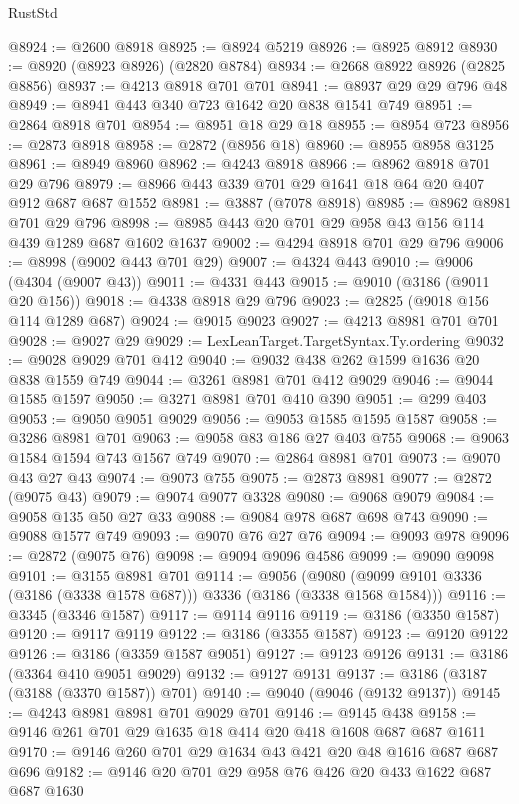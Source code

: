 \begin{lexlean}{RustStd}
\begin{coremodule}
{\begin{coremodule}
{{{{{{{{{{{{{{{{{{{{@8924 := @2600 @8918
@8925 := @8924 @5219
@8926 := @8925 @8912
@8930 := @8920 (@8923 @8926) (@2820 @8784)
@8934 := @2668 @8922 @8926 (@2825 @8856)
@8937 := @4213 @8918 @701 @701
@8941 := @8937 @29 @29 @796 @48
@8949 := @8941 @443 @340 @723 @1642 @20 @838 @1541 @749
@8951 := @2864 @8918 @701
@8954 := @8951 @18 @29 @18
@8955 := @8954 @723
@8956 := @2873 @8918
@8958 := @2872 (@8956 @18)
@8960 := @8955 @8958 @3125
@8961 := @8949 @8960
@8962 := @4243 @8918
@8966 := @8962 @8918 @701 @29 @796
@8979 := @8966 @443 @339 @701 @29 @1641 @18 @64 @20 @407 @912 @687 @687 @1552
@8981 := @3887 (@7078 @8918)
@8985 := @8962 @8981 @701 @29 @796
@8998 := @8985 @443 @20 @701 @29 @958 @43 @156 @114 @439 @1289 @687 @1602 @1637
@9002 := @4294 @8918 @701 @29 @796
@9006 := @8998 (@9002 @443 @701 @29)
@9007 := @4324 @443
@9010 := @9006 (@4304 (@9007 @43))
@9011 := @4331 @443
@9015 := @9010 (@3186 (@9011 @20 @156))
@9018 := @4338 @8918 @29 @796
@9023 := @2825 (@9018 @156 @114 @1289 @687)
@9024 := @9015 @9023
@9027 := @4213 @8981 @701 @701
@9028 := @9027 @29
@9029 := LexLeanTarget.TargetSyntax.Ty.ordering
@9032 := @9028 @9029 @701 @412
@9040 := @9032 @438 @262 @1599 @1636 @20 @838 @1559 @749
@9044 := @3261 @8981 @701 @412 @9029
@9046 := @9044 @1585 @1597
@9050 := @3271 @8981 @701 @410 @390
@9051 := @299 @403
@9053 := @9050 @9051 @9029
@9056 := @9053 @1585 @1595 @1587
@9058 := @3286 @8981 @701
@9063 := @9058 @83 @186 @27 @403 @755
@9068 := @9063 @1584 @1594 @743 @1567 @749
@9070 := @2864 @8981 @701
@9073 := @9070 @43 @27 @43
@9074 := @9073 @755
@9075 := @2873 @8981
@9077 := @2872 (@9075 @43)
@9079 := @9074 @9077 @3328
@9080 := @9068 @9079
@9084 := @9058 @135 @50 @27 @33
@9088 := @9084 @978 @687 @698 @743
@9090 := @9088 @1577 @749
@9093 := @9070 @76 @27 @76
@9094 := @9093 @978
@9096 := @2872 (@9075 @76)
@9098 := @9094 @9096 @4586
@9099 := @9090 @9098
@9101 := @3155 @8981 @701
@9114 := @9056
    (@9080 (@9099 @9101 @3336 (@3186 (@3338 @1578 @687))) @3336 (@3186 (@3338 @1568 @1584)))
@9116 := @3345 (@3346 @1587)
@9117 := @9114 @9116
@9119 := @3186 (@3350 @1587)
@9120 := @9117 @9119
@9122 := @3186 (@3355 @1587)
@9123 := @9120 @9122
@9126 := @3186 (@3359 @1587 @9051)
@9127 := @9123 @9126
@9131 := @3186 (@3364 @410 @9051 @9029)
@9132 := @9127 @9131
@9137 := @3186 (@3187 (@3188 (@3370 @1587)) @701)
@9140 := @9040 (@9046 (@9132 @9137))
@9145 := @4243 @8981 @8981 @701 @9029 @701
@9146 := @9145 @438
@9158 := @9146 @261 @701 @29 @1635 @18 @414 @20 @418 @1608 @687 @687 @1611
@9170 := @9146 @260 @701 @29 @1634 @43 @421 @20 @48 @1616 @687 @687 @696
@9182 := @9146 @20 @701 @29 @958 @76 @426 @20 @433 @1622 @687 @687 @1630
}}}}}}}}}}}}}}}}}}}}
\end{coremodule}}
\end{coremodule}
\end{lexlean}
